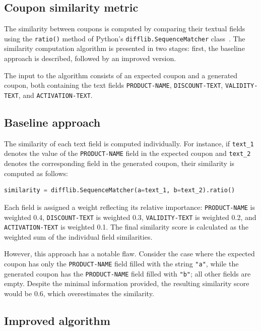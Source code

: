 \documentclass[licencjacka,en]{pracamgr}
\begin{document}
\begin{appendices}

\chapter{Coupon similarity metric} \label{app:coupon_sim}

The similarity between coupons is computed by comparing their textual fields using the \texttt{ratio()} method of Python's \texttt{difflib.SequenceMatcher} class~\cite{python-difflib}. The similarity computation algorithm is presented in two stages: first, the baseline approach is described, followed by an improved version.

The input to the algorithm consists of an expected coupon and a generated coupon, both containing the text fields \texttt{PRODUCT-NAME}, \texttt{DISCOUNT-TEXT}, \texttt{VALIDITY-TEXT}, and \texttt{ACTIVATION-TEXT}.

\section{Baseline approach}

The similarity of each text field is computed individually. For instance, if \texttt{text\_1} denotes the value of the \texttt{PRODUCT-NAME} field in the expected coupon and \texttt{text\_2} denotes the corresponding field in the generated coupon, their similarity is computed as follows:

\begin{lstlisting}[language=Python]
similarity = difflib.SequenceMatcher(a=text_1, b=text_2).ratio()
\end{lstlisting}

Each field is assigned a weight reflecting its relative importance: \texttt{PRODUCT-NAME} is weighted 0.4, \texttt{DISCOUNT-TEXT} is weighted 0.3, \texttt{VALIDITY-TEXT} is weighted 0.2, and \texttt{ACTIVATION-TEXT} is weighted 0.1. The final similarity score is calculated as the weighted sum of the individual field similarities.

However, this approach has a notable flaw. Consider the case where the expected coupon has only the \texttt{PRODUCT-NAME} field filled with the string \texttt{"a"}, while the generated coupon has the \texttt{PRODUCT-NAME} field filled with \texttt{"b"}; all other fields are empty. Despite the minimal information provided, the resulting similarity score would be 0.6, which overestimates the similarity.

\section{Improved algorithm}


\end{appendices}
\end{document}
